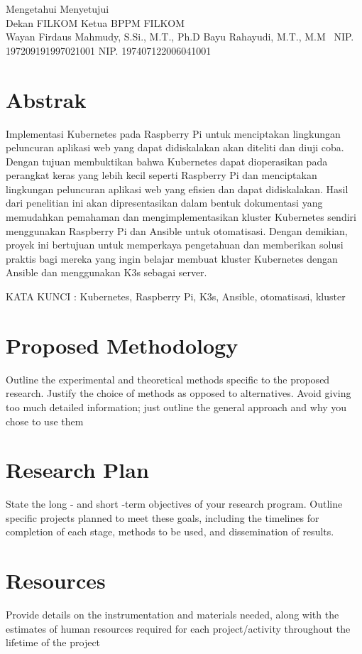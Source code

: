 \documentclass[a4paper,12pt]{article}
\begin{document}
\begin{flushleft}
Mengetahui \hspace{7.7cm} Menyetujui \\
Dekan FILKOM \hspace{6.85cm} Ketua BPPM FILKOM \\
\vspace{1.5cm}
Wayan Firdaus Mahmudy, S.Si., M.T., Ph.D \hspace{1.7cm} Bayu Rahayudi, M.T., M.M \
NIP. 197209191997021001 \hspace{6.05cm} NIP. 197407122006041001    
\end{flushleft}

\section*{Abstrak}
Implementasi Kubernetes pada Raspberry Pi untuk menciptakan lingkungan peluncuran aplikasi web yang dapat didiskalakan akan diteliti dan diuji coba. Dengan tujuan membuktikan bahwa Kubernetes dapat dioperasikan pada perangkat keras yang lebih kecil seperti Raspberry Pi dan menciptakan lingkungan peluncuran aplikasi web yang efisien dan dapat didiskalakan. Hasil dari penelitian ini akan dipresentasikan dalam bentuk dokumentasi yang memudahkan pemahaman dan mengimplementasikan kluster Kubernetes sendiri menggunakan Raspberry Pi dan Ansible untuk otomatisasi. Dengan demikian, proyek ini bertujuan untuk memperkaya pengetahuan dan memberikan solusi praktis bagi mereka yang ingin belajar membuat kluster Kubernetes dengan Ansible dan menggunakan K3s sebagai server.

\begin{flushleft}
KATA KUNCI : Kubernetes, Raspberry Pi, K3s, Ansible, otomatisasi, kluster 
\end{flushleft}
\newpage

\tableofcontents
\newpage

% 
% 


\section{Proposed Methodology}
Outline the experimental and theoretical methods specific to the proposed research. Justify the choice of methods as opposed to alternatives. Avoid giving too much detailed information; just outline the general approach and why you chose to use them

\section{Research Plan}
State the long - and short -term objectives of your research program. Outline specific projects planned to meet these goals, including the timelines for completion of each stage, methods to be used, and dissemination of results. 

\section{Resources}
Provide details on the instrumentation and materials needed, along with the estimates of human resources required for each project/activity throughout the lifetime of the project
\cite{cloud_computing}

\printbibliography
\end{document}
